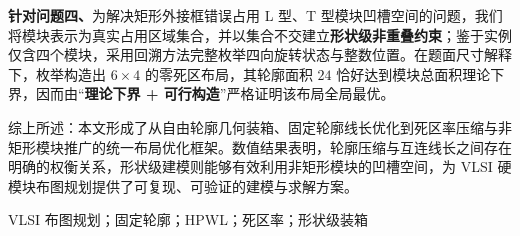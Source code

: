 \documentclass[fontset=windows,a4paper]{ctexart}
\begin{document}
\noindent\textbf{针对问题四、}为解决矩形外接框错误占用 L 型、T 型模块凹槽空间的问题，我们将模块表示为真实占用区域集合，并以集合不交建立\textbf{形状级非重叠约束}；鉴于实例仅含四个模块，采用回溯方法完整枚举四向旋转状态与整数位置。在题面尺寸解释下，枚举构造出 $6\times4$ 的零死区布局，其轮廓面积 $24$ 恰好达到模块总面积理论下界，因而由“\textbf{理论下界 + 可行构造}”严格证明该布局全局最优。

综上所述：本文形成了从自由轮廓几何装箱、固定轮廓线长优化到死区率压缩与非矩形模块推广的统一布局优化框架。数值结果表明，轮廓压缩与互连线长之间存在明确的权衡关系，形状级建模则能够有效利用非矩形模块的凹槽空间，为 VLSI 硬模块布图规划提供了可复现、可验证的建模与求解方案。

\vspace{1cm}
VLSI 布图规划；固定轮廓；HPWL；死区率；形状级装箱

\newpage












\clearpage


\clearpage


\end{document}
